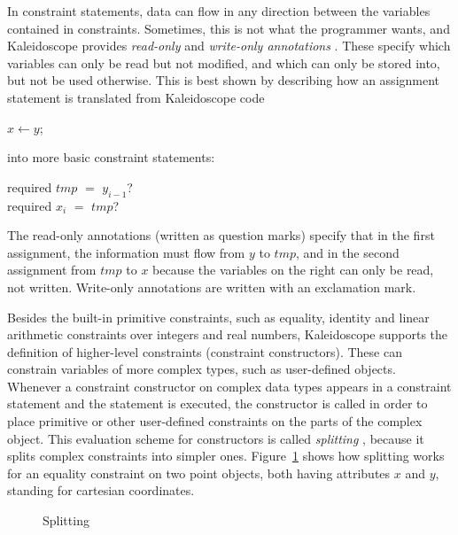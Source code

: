 In constraint statements, data can flow in any direction between the
variables contained in constraints.  Sometimes, this is not what the
programmer wants, and Kaleidoscope provides {\em read-only}%
%
 and {\em
  write-only annotations}%
%
.  These specify which variables can
only be read but not modified, and which can only be stored into, but
not be used otherwise.  This is best shown by describing how an
assignment statement is translated from Kaleidoscope code
%
\begin{ttlprog}
\>$x \leftarrow y$;
\end{ttlprog}
%
into more basic constraint statements:
%
\begin{ttlprog}
 required $tmp$ $=$ $y_{i-1}$?\\
 required $x_i$ $=$ $tmp$?
\end{ttlprog}
%
The read-only annotations (written as question marks) specify that in
the first assignment, the information must flow from $y$ to $tmp$, and
in the second assignment from $tmp$ to $x$ because the variables on
the right can only be read, not written.  Write-only annotations are
written with an exclamation mark.

%
Besides the built-in primitive constraints, such as equality, identity
and linear arithmetic constraints over integers and real numbers,
Kaleidoscope supports the definition of higher-level constraints
(constraint constructors).  These can constrain variables of more
complex types, such as user-defined objects.  Whenever a constraint
constructor on complex data types appears in a constraint statement
and the statement is executed, the constructor is called in order to
place primitive or other user-defined constraints on the parts of the
complex object.  This evaluation scheme for constructors is called
{\em splitting} \cite{lopez97phd}, because it splits complex
constraints into simpler ones.  Figure~\ref{pic:splitting} shows how
splitting works for an equality constraint on two point objects, both
having attributes $x$ and $y$, standing for cartesian coordinates.
%
\begin{figure}[h]
\begin{center}

\end{center}
\caption{Splitting}
\label{pic:splitting}
\end{figure}

